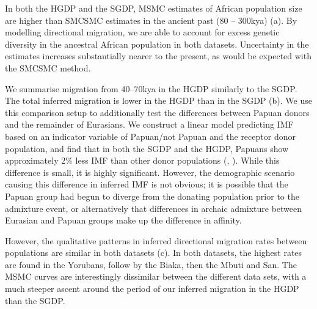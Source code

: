 In both the HGDP and the SGDP, MSMC estimates of African population size are higher than SMCSMC estimates in the ancient past (80 -- 300kya) (a). By modelling directional migration, we are able to account for excess genetic diversity in the ancestral African population in both datasets. Uncertainty in the estimates increases substantially nearer to the present, as would be expected with the SMCSMC method. 

We summarise migration from 40--70kya in the HGDP similarly to the SGDP. The total inferred migration is lower in the HGDP than in the SGDP (b). We use this comparison setup to additionally test the differences between Papuan donors and the remainder of Eurasians. We construct a linear model predicting IMF based on an indicator variable of Papuan/not Papuan and the receptor donor population, and find that in both the SGDP and the HGDP, Papuans show approximately 2\% less IMF than other donor populations (, ). While this difference is small, it is highly significant. However, the demographic scenario causing this difference in inferred IMF is not obvious; it is possible that the Papuan group had begun to diverge from the donating population prior to the admixture event, or alternatively that differences in archaic admixture between Eurasian and Papuan groups make up the difference in affinity. 



However, the qualitative patterns in inferred directional migration rates between populations are similar in both datasets (c). In both datasets, the highest rates are found in the Yorubans, follow by the Biaka, then the Mbuti and San. The MSMC curves are interestingly dissimilar between the different data sets, with a much steeper ascent around the period of our inferred migration in the HGDP than the SGDP. 




